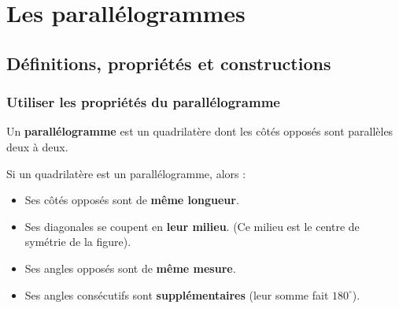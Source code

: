 \documentclass[a4paper]{book}
\begin{document}
\setcounter{chapter}{12}
\renewcommand{\monTitre}{Les parallélogrammes}
\chapter{\monTitre}
\thispagestyle{fancy}

\section{Définitions, propriétés et constructions}
\subsection{Utiliser les propriétés du parallélogramme}

    \begin{definition}
        Un \textbf{parallélogramme} est un quadrilatère dont les côtés opposés sont parallèles deux à deux.
    \end{definition}
    
    
    \begin{propriete}
        Si un quadrilatère est un parallélogramme, alors :
        \begin{itemize}
            \item Ses côtés opposés sont de \textbf{même longueur}.
            \item Ses diagonales se coupent en \textbf{leur milieu}. (Ce milieu est le centre de symétrie de la figure).
            \item Ses angles opposés sont de \textbf{même mesure}.
            \item Ses angles consécutifs sont \textbf{supplémentaires} (leur somme fait $180^{\circ}$).
        \end{itemize}
    \end{propriete}
    
\end{document}
